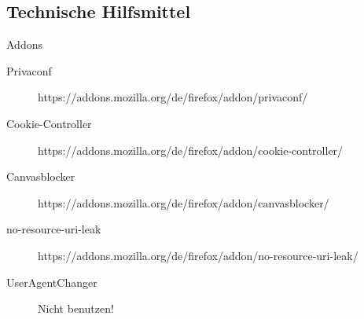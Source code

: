 \documentclass[utf8]{beamer}
\begin{document}
	\subsection{Technische Hilfsmittel}
	\begin{frame}{Addons}
		\noindent
		\begin{description}
			\item[Privaconf]{https://addons.mozilla.org/de/firefox/addon/privaconf/}
			\item[Cookie-Controller]{https://addons.mozilla.org/de/firefox/addon/cookie-controller/}
			\item[Canvasblocker]{https://addons.mozilla.org/de/firefox/addon/canvasblocker/}
			\item[no-resource-uri-leak]{https://addons.mozilla.org/de/firefox/addon/no-resource-uri-leak/}
			\item[UserAgentChanger]{Nicht benutzen!}
		\end{description}
	\end{frame}
	
	
	
	
\end{document}
